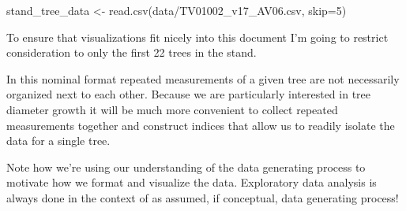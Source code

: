 \documentclass[
  letterpaper,
  DIV=11,
  numbers=noendperiod]{scrartcl}
\newenvironment{Shaded}{\begin{snugshade}}{\end{snugshade}}
\newcommand{\AttributeTok}[1]{\textcolor[rgb]{0.40,0.45,0.13}{#1}}
\newcommand{\DecValTok}[1]{\textcolor[rgb]{0.68,0.00,0.00}{#1}}
\newcommand{\FunctionTok}[1]{\textcolor[rgb]{0.28,0.35,0.67}{#1}}
\newcommand{\NormalTok}[1]{\textcolor[rgb]{0.00,0.23,0.31}{#1}}
\newcommand{\OtherTok}[1]{\textcolor[rgb]{0.00,0.23,0.31}{#1}}
\newcommand{\SpecialCharTok}[1]{\textcolor[rgb]{0.37,0.37,0.37}{#1}}
\newcommand{\StringTok}[1]{\textcolor[rgb]{0.13,0.47,0.30}{#1}}
\begin{document}
\begin{Shaded}
\begin{Highlighting}[]
\NormalTok{stand\_tree\_data }\OtherTok{\textless{}{-}} \FunctionTok{read.csv}\NormalTok{(}\StringTok{\textquotesingle{}data/TV01002\_v17\_AV06.csv\textquotesingle{}}\NormalTok{, }\AttributeTok{skip=}\DecValTok{5}\NormalTok{)}
\end{Highlighting}
\end{Shaded}

To ensure that visualizations fit nicely into this document I'm going to
restrict consideration to only the first 22 trees in the stand.

\begin{Shaded}
\end{Shaded}

In this nominal format repeated measurements of a given tree are not
necessarily organized next to each other. Because we are particularly
interested in tree diameter growth it will be much more convenient to
collect repeated measurements together and construct indices that allow
us to readily isolate the data for a single tree.

Note how we're using our understanding of the data generating process to
motivate how we format and visualize the data. Exploratory data analysis
is always done in the context of as assumed, if conceptual, data
generating process!
\end{document}

